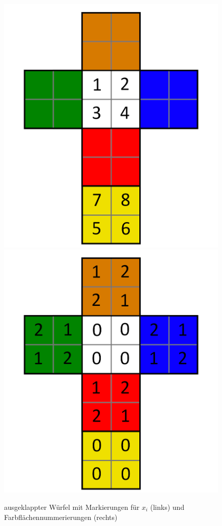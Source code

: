 \documentclass[12pt,a4paper, usenames, dvipsnames]{article}
\theoremstyle{mystyle}
\theoremstyle{definition}
\begin{document}
\begin{figure}[H]
\centering
\includegraphics[scale=0.13]{foldedout_numbers.png}
\includegraphics[scale=0.13]{foldedout_012.png}
\caption[Markierungen $x_i$ (links), Farbflächennummern (rechts)]{ausgeklappter Würfel mit Markierungen für $x_i$ (links) und Farbflächennummerierungen (rechts) }
\end{figure}
\end{document}

